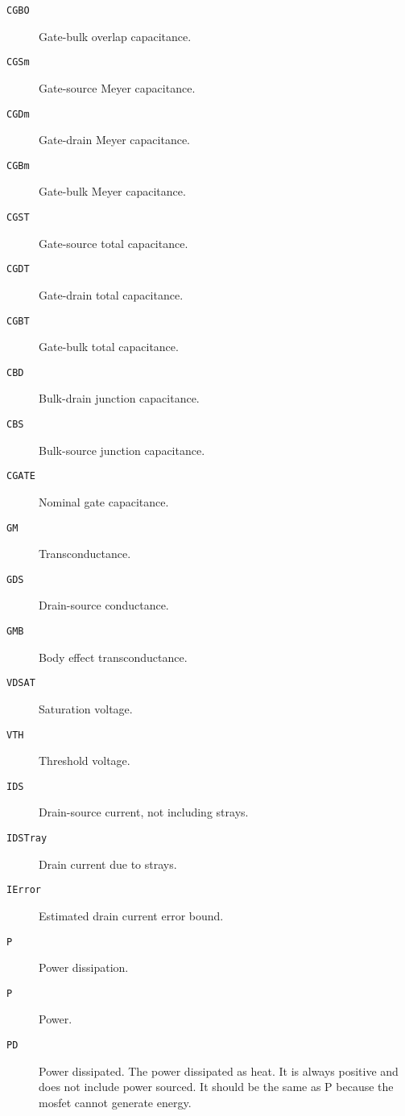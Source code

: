 \begin{description}
\item[{\tt CGBO}] Gate-bulk overlap capacitance.

\item[{\tt CGSm}] Gate-source Meyer capacitance.

\item[{\tt CGDm}] Gate-drain Meyer capacitance.

\item[{\tt CGBm}] Gate-bulk Meyer capacitance.

\item[{\tt CGST}] Gate-source total capacitance.

\item[{\tt CGDT}] Gate-drain total capacitance.

\item[{\tt CGBT}] Gate-bulk total capacitance.

\item[{\tt CBD}] Bulk-drain junction capacitance.

\item[{\tt CBS}] Bulk-source junction capacitance.

\item[{\tt CGATE}] Nominal gate capacitance.

\item[{\tt GM}] Transconductance.

\item[{\tt GDS}] Drain-source conductance.

\item[{\tt GMB}] Body effect transconductance.

\item[{\tt VDSAT}] Saturation voltage.

\item[{\tt VTH}] Threshold voltage.

\item[{\tt IDS}] Drain-source current, not including strays.

\item[{\tt IDSTray}] Drain current due to strays.

\item[{\tt IError}] Estimated drain current error bound.

\item[{\tt P}] Power dissipation.

\item[{\tt P}] Power.

\item[{\tt PD}] Power dissipated.  The power dissipated as heat.  
It is always positive and does not include power sourced.
It should be the same as P because the mosfet cannot generate energy.


\end{description}
